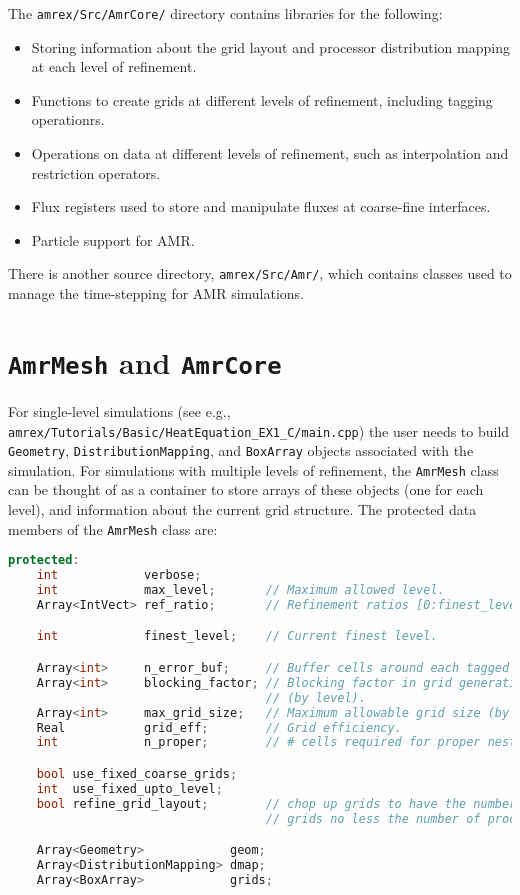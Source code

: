 The {\tt amrex/Src/AmrCore/} directory contains libraries for the following:
\begin{itemize}
\item Storing information about the grid layout and processor distribution mapping
at each level of refinement.
\item Functions to create grids at different levels of refinement, including tagging
operationrs.
\item Operations on data at different levels of refinement, such as interpolation and
restriction operators.
\item Flux registers used to store and manipulate fluxes at coarse-fine interfaces.
\item Particle support for AMR.
\end{itemize}

There is another source directory, {\tt amrex/Src/Amr/}, which contains
classes used to manage the time-stepping for AMR simulations.

\section{{\tt AmrMesh} and {\tt AmrCore}}

For single-level simulations
(see e.g., {\tt amrex/Tutorials/Basic/HeatEquation\_EX1\_C/main.cpp})
the user needs to build {\tt Geometry}, {\tt DistributionMapping},
and {\tt BoxArray} objects associated with the simulation.  For simulations
with multiple levels of refinement, the {\tt AmrMesh} class can be thought
of as a container to store arrays of these objects (one for each level), and
information about the current grid structure.  The protected data
members of the {\tt AmrMesh} class are:
\begin{lstlisting}[language=cpp]
protected:
    int            verbose;
    int            max_level;       // Maximum allowed level.
    Array<IntVect> ref_ratio;       // Refinement ratios [0:finest_level-1]

    int            finest_level;    // Current finest level.

    Array<int>     n_error_buf;     // Buffer cells around each tagged cell.
    Array<int>     blocking_factor; // Blocking factor in grid generation 
                                    // (by level).
    Array<int>     max_grid_size;   // Maximum allowable grid size (by level).
    Real           grid_eff;        // Grid efficiency.
    int            n_proper;        // # cells required for proper nesting.

    bool use_fixed_coarse_grids;
    int  use_fixed_upto_level;
    bool refine_grid_layout;        // chop up grids to have the number of 
                                    // grids no less the number of procs

    Array<Geometry>            geom;
    Array<DistributionMapping> dmap;
    Array<BoxArray>            grids;    
\end{lstlisting}

